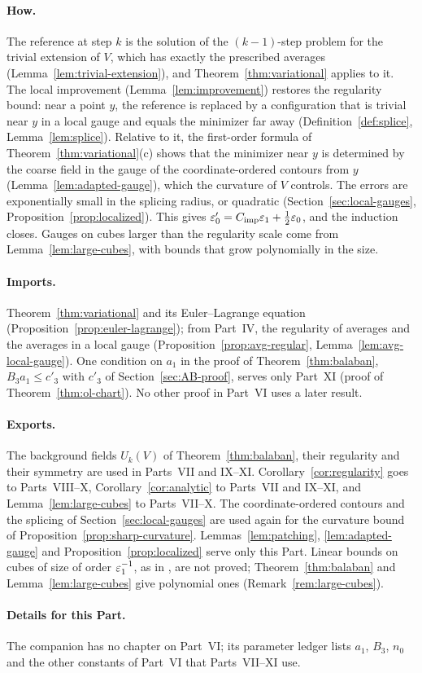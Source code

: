 \paragraph{How.} The reference at step $k$ is the solution of the $(k-1)$-step problem for the trivial extension of $V$, which has exactly the prescribed averages (Lemma~\ref{lem:trivial-extension}), and Theorem~\ref{thm:variational} applies to it. The local improvement (Lemma~\ref{lem:improvement}) restores the regularity bound: near a point $y$, the reference is replaced by a configuration that is trivial near $y$ in a local gauge and equals the minimizer far away (Definition~\ref{def:splice}, Lemma~\ref{lem:splice}). Relative to it, the first-order formula of Theorem~\ref{thm:variational}(c) shows that the minimizer near $y$ is determined by the coarse field in the gauge of the coordinate-ordered contours from $y$ (Lemma~\ref{lem:adapted-gauge}), which the curvature of $V$ controls. The errors are exponentially small in the splicing radius, or quadratic (Section~\ref{sec:local-gauges}, Proposition~\ref{prop:localized}). This gives $\varepsilon_0'=C_{\rm imp}\varepsilon_1+\frac12\varepsilon_0$, and the induction closes. Gauges on cubes larger than the regularity scale come from Lemma~\ref{lem:large-cubes}, with bounds that grow polynomially in the size.

\paragraph{Imports.} Theorem~\ref{thm:variational} and its Euler--Lagrange equation (Proposition~\ref{prop:euler-lagrange}); from Part~IV, the regularity of averages and the averages in a local gauge (Proposition~\ref{prop:avg-regular}, Lemma~\ref{lem:avg-local-gauge}). One condition on $a_1$ in the proof of Theorem~\ref{thm:balaban}, $B_3a_1\le c'_3$ with $c'_3$ of Section~\ref{sec:AB-proof}, serves only Part~XI (proof of Theorem~\ref{thm:ol-chart}). No other proof in Part~VI uses a later result.

\paragraph{Exports.} The background fields $U_k(V)$ of Theorem~\ref{thm:balaban}, their regularity and their symmetry are used in Parts~VII and IX--XI. Corollary~\ref{cor:regularity} goes to Parts~VIII--X, Corollary~\ref{cor:analytic} to Parts~VII and IX--XI, and Lemma~\ref{lem:large-cubes} to Parts~VII--X. The coordinate-ordered contours and the splicing of Section~\ref{sec:local-gauges} are used again for the curvature bound of Proposition~\ref{prop:sharp-curvature}. Lemmas~\ref{lem:patching}, \ref{lem:adapted-gauge} and Proposition~\ref{prop:localized} serve only this Part. Linear bounds on cubes of size of order $\varepsilon_1^{-1}$, as in \cite[(9), (10)]{BalVar}, are not proved; Theorem~\ref{thm:balaban} and Lemma~\ref{lem:large-cubes} give polynomial ones (Remark~\ref{rem:large-cubes}).

\paragraph{Details for this Part.} The companion has no chapter on Part~VI; its parameter ledger lists $a_1$, $B_3$, $n_0$ and the other constants of Part~VI that Parts~VII--XI use.
